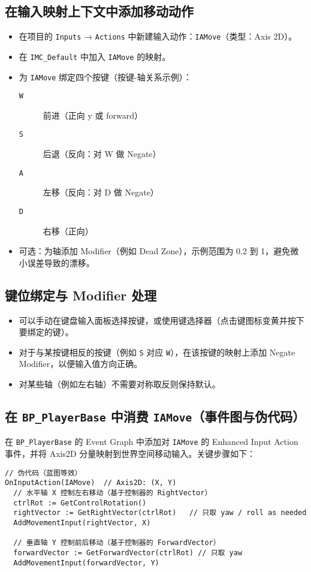 \documentclass[10pt,CJKmath]{zhbook-v1}
\newcommand{\il}[1]{\texttt{#1}}%
\begin{document}
\subsection{在输入映射上下文中添加移动动作}
\begin{itemize}
  \item 在项目的 \il{Inputs} → \il{Actions} 中新建输入动作：\il{IAMove}（类型：Axis 2D）。
  \item 在 \il{IMC_Default} 中加入 \il{IAMove} 的映射。
  \item 为 \il{IAMove} 绑定四个按键（按键-轴关系示例）：
    \begin{description}
      \item[\il{W}] 前进（正向 y 或 forward）
      \item[\il{S}] 后退（反向：对 W 做 Negate）
      \item[\il{A}] 左移（反向：对 D 做 Negate）
      \item[\il{D}] 右移（正向）
    \end{description}
  \item 可选：为轴添加 Modifier（例如 Dead Zone），示例范围为 0.2 到 1，避免微小误差导致的漂移。
\end{itemize}

\subsection{键位绑定与 Modifier 处理}
\begin{itemize}
  \item 可以手动在键盘输入面板选择按键，或使用键选择器（点击键图标变黄并按下要绑定的键）。
  \item 对于与某按键相反的按键（例如 \il{S} 对应 \il{W}），在该按键的映射上添加 Negate Modifier，以便输入值方向正确。
  \item 对某些轴（例如左右轴）不需要对称取反则保持默认。
\end{itemize}

\subsection{在 \il{BP_PlayerBase} 中消费 \il{IAMove}（事件图与伪代码）}
在 \il{BP_PlayerBase} 的 Event Graph 中添加对 \il{IAMove} 的 Enhanced Input Action 事件，并将 Axis2D 分量映射到世界空间移动输入。关键步骤如下：

\begin{verbatim}
// 伪代码（蓝图等效）
OnInputAction(IAMove)  // Axis2D: (X, Y)
  // 水平轴 X 控制左右移动（基于控制器的 RightVector）
  ctrlRot := GetControlRotation()
  rightVector := GetRightVector(ctrlRot)   // 只取 yaw / roll as needed
  AddMovementInput(rightVector, X)

  // 垂直轴 Y 控制前后移动（基于控制器的 ForwardVector）
  forwardVector := GetForwardVector(ctrlRot) // 只取 yaw
  AddMovementInput(forwardVector, Y)
\end{verbatim}
\end{document}
